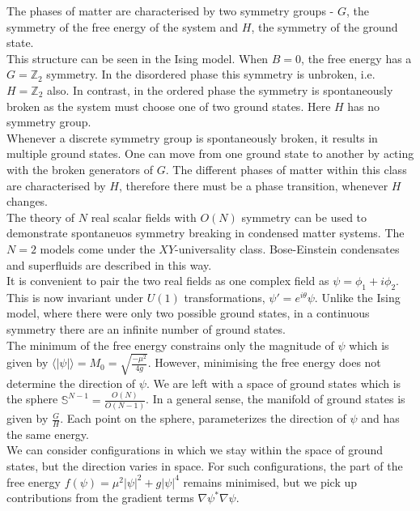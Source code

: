 The phases of matter are characterised by two symmetry groups - $G$, the symmetry of the free energy of the system and $H$, the symmetry of the ground state.\\

\noindent This structure can be seen in the Ising model. When $B=0$, the free energy has a $G=\mathbb{Z}_2$ symmetry. In the disordered phase this symmetry is unbroken, i.e. $H=\mathbb{Z}_2$ also. In contrast, in the ordered phase the symmetry is spontaneously broken as the system must choose one of two ground states. Here $H$ has no symmetry group.\\ 

\noindent Whenever a discrete symmetry group is spontaneously broken, it results in multiple ground states. One can move from one ground state to another by acting with the broken generators of $G$. The different phases of matter within this class are characterised by $H$, therefore there must be a phase transition, whenever $H$ changes.\\

\noindent The theory of $N$ real scalar fields with $O(N)$ symmetry can be used to demonstrate spontaneuos symmetry breaking in condensed matter systems. The $N=2$ models come under the $XY$-universality class. Bose-Einstein condensates and superfluids are described in this way.\\ 

\noindent It is convenient to pair the two real fields as one complex field as $\psi=\phi_1+i\phi_2$. This is now invariant under $U(1)$ transformations, $\psi'=e^{i\theta}\psi$. Unlike the Ising model, where there were only two possible ground states, in a continuous symmetry there are an infinite number of ground states.\\ 

\noindent The minimum of the free energy constrains only the magnitude of $\psi$ which is given by $\langle|\psi|\rangle=M_0=\sqrt{\frac{-\mu^2}{4g}}$. However, minimising the free energy does not determine the direction of $\psi$. We are left with a space of ground states which is the sphere $\mathbb{S}^{N-1}=\frac{O(N)}{O(N-1)}$. In a general sense, the manifold of ground states is given by $\frac{G}{H}$. Each point on the sphere, parameterizes the direction of $\psi$ and has the same energy.\\

\noindent We can consider configurations in which we stay within the space of ground states, but the direction varies in space. For such configurations, the part of the free energy $f(\psi)=\mu^2|\psi|^2+g|\psi|^4$ remains minimised, but we pick up contributions from the gradient terms $\nabla\psi^*\nabla\psi$.\\

